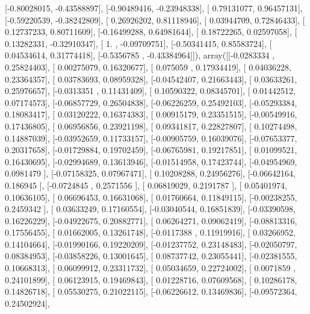 \documentclass{article}
\begin{document}
       [-0.80028015, -0.43588897],
       [-0.90489416, -0.23948338],
       [ 0.79131077,  0.96457131],
       [-0.59220539, -0.38242809],
       [ 0.26926202,  0.81118946],
       [ 0.03944709,  0.72846433],
       [ 0.12737233,  0.80711609],
       [-0.16499288,  0.64981644],
       [ 0.18722265,  0.02597058],
       [ 0.13282331, -0.32910347],
       [ 1.        , -0.09709751],
       [-0.50341415,  0.85583724],
       [ 0.04534614,  0.31774418],
       [-0.5356785 , -0.43384964]]), array([[-0.0283334 ,  0.25824403],
       [ 0.00275079,  0.16320677],
       [ 0.075059  ,  0.17934419],
       [ 0.04036228,  0.23364357],
       [ 0.03783693,  0.08959328],
       [-0.04542407,  0.21663443],
       [ 0.03633261,  0.25976657],
       [-0.0313351 ,  0.11431409],
       [ 0.10590322,  0.08345701],
       [ 0.01442512,  0.07174573],
       [-0.06857729,  0.26504838],
       [-0.06226259,  0.25492103],
       [-0.05293384,  0.18083417],
       [ 0.03120222,  0.16374383],
       [ 0.00915179,  0.23351515],
       [-0.00549916,  0.17436805],
       [ 0.06956856,  0.23921198],
       [ 0.09341817,  0.22827807],
       [ 0.10274498,  0.14887039],
       [-0.03952659,  0.11733157],
       [-0.00905759,  0.16039076],
       [-0.07653377,  0.20317658],
       [-0.01729884,  0.19702459],
       [-0.06765981,  0.19217851],
       [ 0.01099521,  0.16430695],
       [-0.02994689,  0.13613946],
       [-0.01514958,  0.17423744],
       [-0.04954969,  0.0981479 ],
       [-0.07158325,  0.07967471],
       [ 0.10208288,  0.24956276],
       [-0.06642164,  0.186945  ],
       [-0.0724845 ,  0.2571556 ],
       [ 0.06819029,  0.2191787 ],
       [ 0.05401974,  0.10636105],
       [ 0.06696453,  0.16631068],
       [ 0.01760664,  0.11849115],
       [-0.00238255,  0.2459342 ],
       [ 0.03633249,  0.17160554],
       [-0.03040544,  0.16851839],
       [-0.03390598,  0.16226229],
       [-0.04922675,  0.20882771],
       [ 0.06264271,  0.09062419],
       [-0.08813316,  0.17556455],
       [ 0.01662005,  0.13261748],
       [-0.0117388 ,  0.11919916],
       [ 0.03266952,  0.14104664],
       [-0.01990166,  0.19220209],
       [-0.01237752,  0.23148483],
       [-0.02050797,  0.08384953],
       [-0.03858226,  0.13001645],
       [ 0.08737742,  0.23055441],
       [-0.02381555,  0.10668313],
       [ 0.06099912,  0.23311732],
       [ 0.05034659,  0.22724002],
       [ 0.0071859 ,  0.24101899],
       [ 0.06123915,  0.19469843],
       [ 0.01228716,  0.07609568],
       [ 0.10286178,  0.14826718],
       [ 0.05530275,  0.21022115],
       [-0.06226612,  0.13469836],
       [-0.09572364,  0.24502924],
\end{document}
